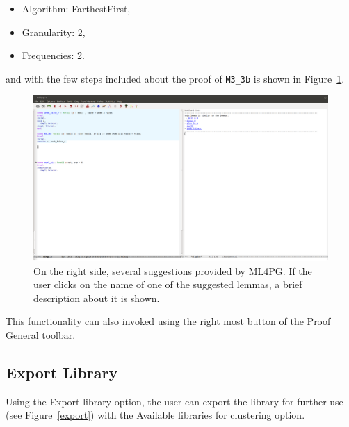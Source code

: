 \documentclass[10pt]{article}
\begin{document}
\begin{itemize}
 \item Algorithm: FarthestFirst,
 \item Granularity: 2,
 \item Frequencies: 2.
\end{itemize}

\noindent and with the few steps included about the proof of \verb"M3_3b" is shown in Figure~\ref{clusters2}.


\begin{figure}
 \centering
 \includegraphics[scale=0.23]{images/clusters2pg.png}
 \caption{On the right side, several suggestions provided by ML4PG. If the user clicks on the name of one of the
suggested lemmas, a brief description about it is shown.}\label{clusters2}
\end{figure}

This functionality can also invoked using the right most button of the Proof General toolbar.

\subsection{Export Library}

Using the Export library option, the user can export the library for further use (see Figure~\ref{export}) with the 
Available libraries for clustering option. 
\end{document}
